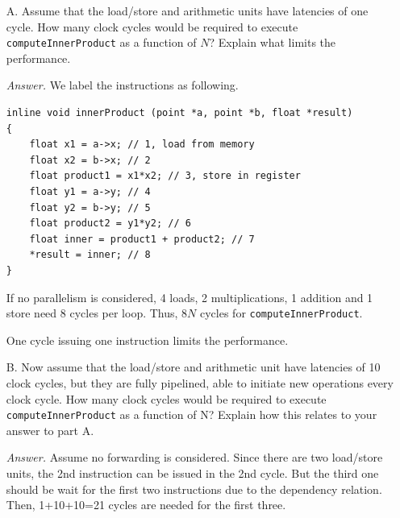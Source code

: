 \documentclass[english]{thesis}
\begin{document}
\begin{itemize}
\item[A.] Assume that the load/store and arithmetic units have latencies of one cycle.
How many clock cycles would be required to execute \verb'computeInnerProduct' as a function of $N$?
Explain what limits the performance.

\bigskip
\textit{Answer.} We label the instructions as following.
\begin{lstlisting}
inline void innerProduct (point *a, point *b, float *result)
{
	float x1 = a->x; // 1, load from memory
	float x2 = b->x; // 2
	float product1 = x1*x2; // 3, store in register
	float y1 = a->y; // 4
	float y2 = b->y; // 5
	float product2 = y1*y2; // 6
	float inner = product1 + product2; // 7
	*result = inner; // 8
}
\end{lstlisting}

If no parallelism is considered, 4 loads, 2 multiplications, 1 addition and 1 store need 8 cycles per loop.
Thus, $8N$ cycles for \verb'computeInnerProduct'.

One cycle issuing one instruction limits the performance.




\bigskip
\item[B.] Now assume that the load/store and arithmetic unit have latencies of 10 clock cycles,
but they are fully pipelined, able to initiate new operations every clock cycle.
How many clock cycles would be required to execute \verb'computeInnerProduct' as a function of N?
Explain how this relates to your answer to part A.

\bigskip
\textit{Answer.} Assume no forwarding is considered.
Since there are two load/store units, the 2nd instruction can be issued in the 2nd cycle.
But the third one should be wait for the first two instructions due to the dependency relation.
Then, 1+10+10=21 cycles are needed for the first three.


\end{itemize}
\end{document}
